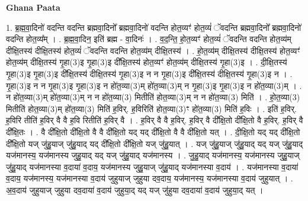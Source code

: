 \documentclass[17pt]{extarticle}
\begin{document}
\textbf{Ghana Paata } \newline

1. ब्र॒ह्म॒वा॒दिनो॑ वदन्ति वदन्ति ब्रह्मवा॒दिनो᳚ ब्रह्मवा॒दिनो॑ वदन्ति होत॒व्यꣳ॑ होत॒व्यं॑ ॅवदन्ति ब्रह्मवा॒दिनो᳚ ब्रह्मवा॒दिनो॑ वदन्ति होत॒व्य᳚म् । . ब्र॒ह्म॒वा॒दिन॒ इति॑ ब्रह्म - वा॒दिनः॑ । . व॒द॒न्ति॒ हो॒त॒व्यꣳ॑ होत॒व्यं॑ ॅवदन्ति वदन्ति होत॒व्य॑म् दीक्षि॒तस्य॑ दीक्षि॒तस्य॑ होत॒व्यं॑ ॅवदन्ति वदन्ति होत॒व्य॑म् दीक्षि॒तस्य॑ । . हो॒त॒व्य॑म् दीक्षि॒तस्य॑ दीक्षि॒तस्य॑ होत॒व्यꣳ॑ होत॒व्य॑म् दीक्षि॒तस्य॑ गृ॒हा(3)इ गृ॒हा(3)इ दी᳚क्षि॒तस्य॑ होत॒व्यꣳ॑ होत॒व्य॑म् दीक्षि॒तस्य॑ गृ॒हा(3)इ । . दी॒क्षि॒तस्य॑ गृ॒हा(3)इ गृ॒हा(3)इ दी᳚क्षि॒तस्य॑ दीक्षि॒तस्य॑ गृ॒हा(3)इ न न गृ॒हा(3)इ दी᳚क्षि॒तस्य॑ दीक्षि॒तस्य॑ गृ॒हा(3)इ न । . गृ॒हा(3)इ न न गृ॒हा(3)इ गृ॒हा(3)इ न हो॑त॒व्या(3)म् हो॑त॒व्या(3)म् न गृ॒हा(3)इ गृ॒हा(3)इ न हो॑त॒व्या(3)म् । . न हो॑त॒व्या(3)म्  हो॑त॒व्या(3)म् न न हो॑त॒व्या(3) मितीति॑ होत॒व्या(3)म् न न हो॑त॒व्या(3) मिति॑ । . हो॒त॒व्या(3) मितीति॑ होत॒व्या(3)म् हो॑त॒व्या(3) मिति॑ ह॒विर्. ह॒विरिति॑ होत॒व्या(3)ꣳ हो॑त॒व्या(3) मिति॑ ह॒विः । . इति॑ ह॒विर्. ह॒विरि तीति॑ ह॒विर् वै वै ह॒वि रितीति॑ ह॒विर् वै । . ह॒विर् वै वै ह॒विर्. ह॒विर् वै दी᳚क्षि॒तो दी᳚क्षि॒तो वै ह॒विर्. ह॒विर् वै दी᳚क्षि॒तः । . वै दी᳚क्षि॒तो दी᳚क्षि॒तो वै वै दी᳚क्षि॒तो यद् यद् दी᳚क्षि॒तो वै वै दी᳚क्षि॒तो यत् । . दी॒क्षि॒तो यद् यद् दी᳚क्षि॒तो दी᳚क्षि॒तो यज् जु॑हु॒याज् जु॑हु॒याद् यद् दी᳚क्षि॒तो दी᳚क्षि॒तो यज् जु॑हु॒यात् । . यज् जु॑हु॒याज् जु॑हु॒याद् यद् यज् जु॑हु॒याद् यज॑मानस्य॒ यज॑मानस्य जुहु॒याद् यद् यज् जु॑हु॒याद् यज॑मानस्य । . जु॒हु॒याद् यज॑मानस्य॒ यज॑मानस्य जुहु॒याज् जु॑हु॒याद् यज॑मानस्या व॒दाया॑ व॒दाय॒ यज॑मानस्य जुहु॒याज् जु॑हु॒याद् यज॑मानस्या व॒दाय॑ । . यज॑मानस्या व॒दाया॑ व॒दाय॒ यज॑मानस्य॒ यज॑मानस्या व॒दाय॑ जुहुयाज् जुहुया दव॒दाय॒ यज॑मानस्य॒ यज॑मानस्या व॒दाय॑ जुहुयात् । . अ॒व॒दाय॑ जुहुयाज् जुहुया दव॒दाया॑ व॒दाय॑ जुहुया॒द् यद् यज् जु॑हुया दव॒दाया॑ व॒दाय॑ जुहुया॒द् यत् । \newline
\end{document}
